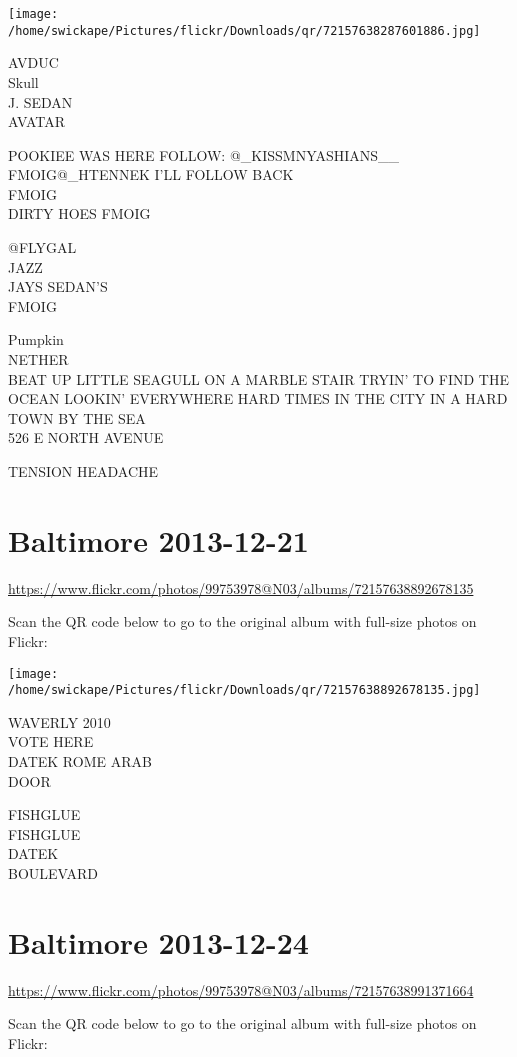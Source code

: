 \documentclass[10pt,letterpaper]{article}
\begin{document}
\texttt{[image: /home/swickape/Pictures/flickr/Downloads/qr/72157638287601886.jpg]}


AVDUC\\
Skull\\
J. SEDAN\\
AVATAR

POOKIEE WAS HERE FOLLOW: @\_KISSMNYASHIANS\_\_\\
FMOIG@\_HTENNEK I'LL FOLLOW BACK\\
FMOIG\\
DIRTY HOES FMOIG

@FLYGAL\\
JAZZ\\
JAYS SEDAN'S\\
FMOIG

Pumpkin\\
NETHER\\
BEAT UP LITTLE SEAGULL ON A MARBLE STAIR TRYIN' TO FIND THE OCEAN LOOKIN' EVERYWHERE HARD TIMES IN THE CITY IN A HARD TOWN BY THE SEA\\
526 E NORTH AVENUE

TENSION HEADACHE


\section*{Baltimore 2013-12-21}

\url{https://www.flickr.com/photos/99753978@N03/albums/72157638892678135}

Scan the QR code below to go to the original album with full-size photos on Flickr:

\texttt{[image: /home/swickape/Pictures/flickr/Downloads/qr/72157638892678135.jpg]}


WAVERLY 2010\\
VOTE HERE\\
DATEK ROME ARAB\\
DOOR

FISHGLUE\\
FISHGLUE\\
DATEK\\
BOULEVARD


\section*{Baltimore 2013-12-24}

\url{https://www.flickr.com/photos/99753978@N03/albums/72157638991371664}

Scan the QR code below to go to the original album with full-size photos on Flickr:
\end{document}
